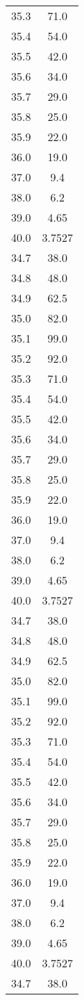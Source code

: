 \begin{table}
\begin{tabular}{S[]S[]}
35.3 & 71.0\\
35.4 & 54.0\\
35.5 & 42.0\\
35.6 & 34.0\\
35.7 & 29.0\\
35.8 & 25.0\\
35.9 & 22.0\\
36.0 & 19.0\\
37.0 & 9.4\\
38.0 & 6.2\\
39.0 & 4.65\\
40.0 & 3.7527\\
34.7 & 38.0\\
34.8 & 48.0\\
34.9 & 62.5\\
35.0 & 82.0\\
35.1 & 99.0\\
35.2 & 92.0\\
35.3 & 71.0\\
35.4 & 54.0\\
35.5 & 42.0\\
35.6 & 34.0\\
35.7 & 29.0\\
35.8 & 25.0\\
35.9 & 22.0\\
36.0 & 19.0\\
37.0 & 9.4\\
38.0 & 6.2\\
39.0 & 4.65\\
40.0 & 3.7527\\
34.7 & 38.0\\
34.8 & 48.0\\
34.9 & 62.5\\
35.0 & 82.0\\
35.1 & 99.0\\
35.2 & 92.0\\
35.3 & 71.0\\
35.4 & 54.0\\
35.5 & 42.0\\
35.6 & 34.0\\
35.7 & 29.0\\
35.8 & 25.0\\
35.9 & 22.0\\
36.0 & 19.0\\
37.0 & 9.4\\
38.0 & 6.2\\
39.0 & 4.65\\
40.0 & 3.7527\\
34.7 & 38.0\\

\end{tabular}
\end{table}
